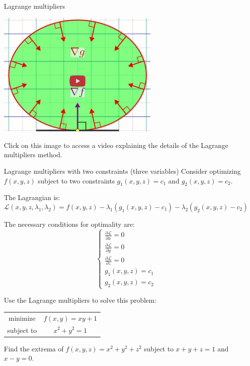 \documentclass[c]{beamer}
\begin{document}
\begin{frame}{Lagrange multipliers}
  \begin{center}
  \href{https://www.youtube.com/watch?v=5A39Ht9Wcu0}{\includegraphics[width=0.6\textwidth]{../figures/Lagrange.png}}
  \end{center}
  Click on this image to access a video explaining the details of the Lagrange multipliers method.
\end{frame}


\begin{frame}[allowframebreaks]{Lagrange multipliers with two constraints (three variables)}
  Consider optimizing $f(x, y, z)$ subject to two constraints $g_1(x, y, z) = c_1$ and $g_2(x, y, z) = c_2$.

  The Lagrangian is:
  \[
    \mathcal{L}(x, y, z, \lambda_1, \lambda_2) = f(x, y, z) - \lambda_1 (g_1(x, y, z) - c_1) - \lambda_2 (g_2(x, y, z) - c_2)
  \]

  The necessary conditions for optimality are:
  \[
  \begin{cases}
    \frac{\partial \mathcal{L}}{\partial x} = 0 \\
    \frac{\partial \mathcal{L}}{\partial y} = 0 \\
    \frac{\partial \mathcal{L}}{\partial z} = 0 \\
    g_1(x, y, z) = c_1 \\
    g_2(x, y, z) = c_2
  \end{cases}
  \]


\end{frame}

\begin{frame}
\begin{Exercise}
  Use the Lagrange multipliers to solve this problem:
  \begin{center}
    \begin{tabular}{cc}
      minimize & $f(x,y)=xy+1$ \\
      subject to & $x^2+y^2=1$
    \end{tabular}
  \end{center}
\end{Exercise}
  \begin{Exercise}
    Find the extrema of $f(x, y, z) = x^2 + y^2 + z^2$ subject to $x + y + z = 1$ and $x - y = 0$.
  \end{Exercise}
\end{frame}
\end{document}
